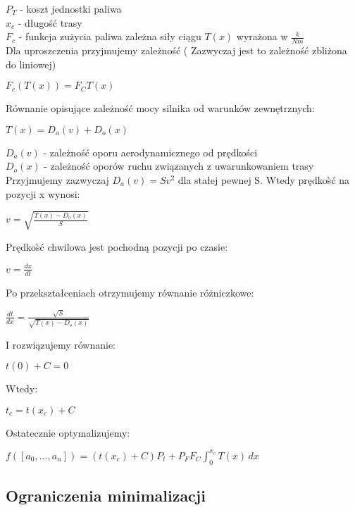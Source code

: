 \documentclass[12pt, letterpaper, twoside]{article}
\begin{document}
\(P_T\) - koszt jednostki paliwa \\
\(x_c\) - długo{{\' s}}ć trasy\\
\(F_c\) - funkcja zużycia paliwa zależna siły ciągu \(T(x)\) wyrażona w \( \frac{k}{N m}\) \\
Dla uproszczenia przyjmujemy zależno{{\' s}}ć ( Zazwyczaj jest to zależno{{\' s}}ć zbliżona do liniowej) \\
\begin{center}
 \(F_c(T(x)) = F_C T(x) \) \\
\end{center}
Równanie opisujące zależno{{\' s}}ć mocy silnika od warunków zewnętrznych:\\
\begin{center}
\( T(x) = D_a(v) + D_o(x) \) \\
\end{center}
\( D_a(v) \) - zależno{{\' s}}ć oporu aerodynamicznego od prędko{{\' s}}ci \\
\( D_o(x) \) - zależno{{\' s}}ć oporów ruchu związanych z uwarunkowaniem trasy \\
Przyjmujemy zazwyczaj \(D_a(v) = Sv^2 \) dla stałej pewnej S.
Wtedy prędko{{\`s}}ć na pozycji x wynosi: \\
\begin{center}
\(v =\sqrt{\frac{T(x) - D_o(x) }{ S} } \)
\end{center}
Prędko{{\`s}}ć chwilowa jest pochodną pozycji po czasie: \\
\begin{center}
\(v =\frac{dx}{dt} \)
\end{center}
Po przekształceniach otrzymujemy równanie różniczkowe:
\begin{center}
\(\frac{dt}{dx} = \frac{\sqrt{S}}{\sqrt{T(x) - D_o(x)}} \) \\
\end{center}
I rozwiązujemy równanie:
\begin{center}
\(  t(0) + C = 0 \) \\
\end{center}
Wtedy:
\begin{center}
\(  t_c = t(x_c) + C \) \\
\end{center}
Ostatecznie optymalizujemy:
\begin{center}
\( f([a_0, ..., a_n]) = (t(x_c) + C )P_t + P_F F_C \int_{0}^{x_c}  T(x) \,dx \)\\
\end{center}
\pagebreak
\begin{center}
\section*{Ograniczenia minimalizacji}
\end{center}
\end{document}
